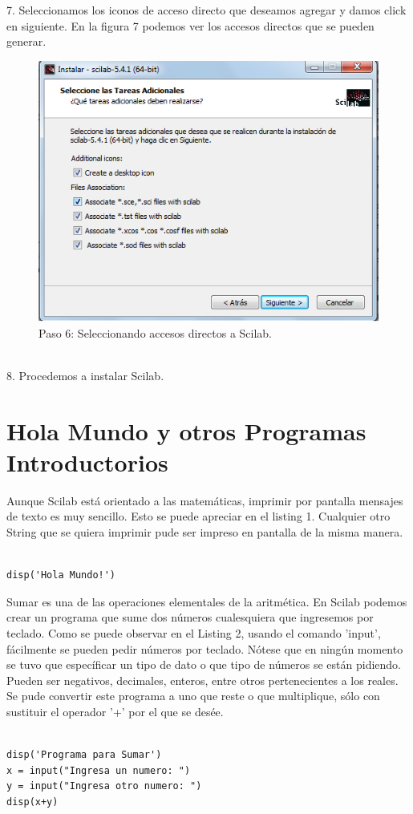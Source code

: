 \documentclass[11pt]{article} %
\begin{document}
7.	Seleccionamos los iconos de acceso directo que deseamos agregar y damos click en siguiente. 
	En la figura 7 podemos ver los accesos directos que se pueden generar.
\\%
\begin{figure}[!h]
  \centering
    \includegraphics[scale=0.5]{Captura6}
  \caption{Paso 6: Seleccionando accesos directos a Scilab.}
  \label{fig:paso6}
\end{figure}
\\%

8.	Procedemos a instalar Scilab.
\\%

\section{Hola Mundo y otros Programas Introductorios}


Aunque Scilab está orientado a las matemáticas, imprimir por pantalla mensajes de texto es muy sencillo. Esto se puede apreciar en el listing 1. Cualquier otro String que se quiera imprimir pude ser impreso en pantalla de la misma manera.
\lstset{language=Scilab}          %
\begin{lstlisting}[caption= Código escrito en Scilab para imprimir por pantalla "Hola Mundo!", label=amb, frame=single]  % Start your code-block

disp('Hola Mundo!')
\end{lstlisting}

Sumar es una de las operaciones elementales de la aritmética. En Scilab podemos crear un programa que sume dos números cualesquiera que ingresemos por teclado. Como se puede observar en el Listing 2, usando el comando 'input', fácilmente se pueden pedir números por teclado. Nótese que en ningún momento se tuvo que específicar un tipo de dato o que tipo de números se están pidiendo. Pueden ser negativos, decimales, enteros, entre otros pertenecientes a los reales. Se pude convertir este programa a uno que reste o que multiplique, sólo con sustituir el operador '+' por el que se desée.

\begin{lstlisting}[caption= Código escrito en Scilab para sumar dos números ingresados por teclado, label=amb, frame=single]  % Start your code-block

disp('Programa para Sumar')
x = input("Ingresa un numero: ")
y = input("Ingresa otro numero: ")
disp(x+y)
\end{lstlisting}
\end{document}
